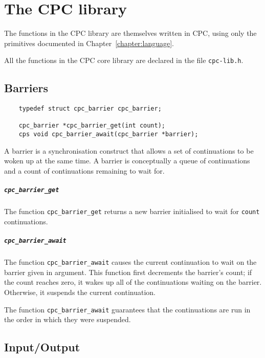 \documentclass[a4paper]{report}
\begin{document}
\chapter{The CPC library}

The functions in the CPC library are themselves written in CPC, using
only the primitives documented in Chapter~\ref{chapter:language}.

All the functions in the CPC core library are declared in the file
{\tt cpc-lib.h}.

\section{Barriers}

\begin{verbatim}
    typedef struct cpc_barrier cpc_barrier;

    cpc_barrier *cpc_barrier_get(int count);
    cps void cpc_barrier_await(cpc_barrier *barrier);
\end{verbatim}

A barrier is a synchronisation construct that allows a set of
continuations to be woken up at the same time.  A barrier is
conceptually a queue of continuations and a count of continuations
remaining to wait for.

\paragraph{\tt cpc\_barrier\_get} The function {\tt cpc\_barrier\_get}
returns a new barrier initialised to wait for {\tt count}
continuations.

\paragraph{\tt cpc\_barrier\_await} The function {\tt cpc\_barrier\_await}
causes the current continuation to wait on the barrier given in
argument.  This function first decrements the barrier's count; if the
count reaches zero, it wakes up all of the continuations waiting on
the barrier.  Otherwise, it suspends the current continuation.

The function {\tt cpc\_barrier\_await} guarantees that the
continuations are run in the order in which they were suspended.

\section{Input/Output}
\end{document}
